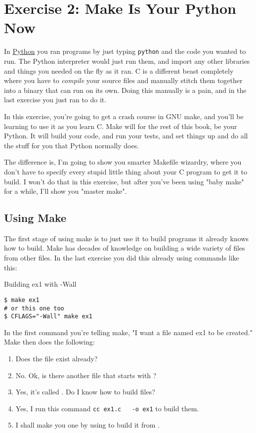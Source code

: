 \chapter{Exercise 2: Make Is Your Python Now}

In \href{http://learnpythonthehardway.org}{Python} you ran programs by just
typing \verb|python| and the code you wanted to run.  The Python interpreter
would just run them, and import any other libraries and things you needed
on the fly as it ran.  C is a different beast completely where you have to
\emph{compile} your source files and manually stitch them together into
a binary that can run on its own.  Doing this manually is a pain, and in
the last exercise you just ran  to do it.

In this exercise, you're going to get a crash course in GNU make, and you'll
be learning to use it as you learn C.  Make will for the rest of this book,
be your Python.  It will build your code, and run your tests, and set things
up and do all the stuff for you that Python normally does.

The difference is, I'm going to show you smarter Makefile wizardry, where you
don't have to specify every stupid little thing about your C program to get
it to build.  I won't do that in this exercise, but after you've been using
"baby make" for a while, I'll show you "master make".

\section{Using Make}

The first stage of using make is to just use it to build programs
it already knows how to build.  Make has decades of knowledge on building
a wide variety of files from other files.  In the last exercise you
did this already using commands like this:

\begin{Terminal}{Building ex1 with -Wall}
\begin{lstlisting}
$ make ex1
# or this one too
$ CFLAGS="-Wall" make ex1
\end{lstlisting}
\end{Terminal}

In the first command you're telling make, "I want a file named ex1 to 
be created."  Make then does the following:

\begin{enumerate}
\item Does the file  exist already?
\item No. Ok, is there another file that starts with ?
\item Yes, it's called . Do I know how to build  files?
\item Yes, I run this command \verb|cc ex1.c   -o ex1| to build them.
\item I shall make you one  by using  to build it from .
\end{enumerate}

